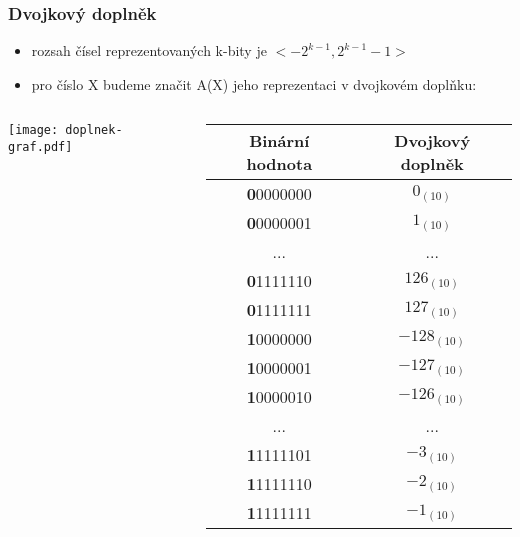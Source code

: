 \documentclass{beamer}
\begin{document}
\begin{frame}
\frametitle{Dvojkový doplněk}
\begin{itemize}
\item rozsah čísel reprezentovaných k-bity je $<-2^{k-1}, 2^{k-1}-1>$
\item pro číslo X budeme značit A(X) jeho reprezentaci v dvojkovém doplňku:
\end{itemize}
\vspace{-0.3cm}
\begin{columns}
\begin{column}{0.5\textwidth}
\texttt{[image: doplnek-graf.pdf]}
\end{column}
\hfill
\begin{column}{0.5\textwidth}
\begin{tabular}{|c|c|}\hline
{\small Binární hodnota}  & {\small Dvojkový doplněk} \\\hline
\textbf{0}0000000 & $0_{(10)}$ \\ \hline
\textbf{0}0000001 & $1_{(10)}$ \\ \hline
... & ... \\\hline
\textbf{0}1111110 & $126_{(10)}$ \\ \hline
\textbf{0}1111111 & $127_{(10)}$ \\ \hline
\textbf{1}0000000 & $-128_{(10)}$ \\ \hline
\textbf{1}0000001 & $-127_{(10)}$ \\ \hline
\textbf{1}0000010 & $-126_{(10)}$ \\ \hline
... & ... \\\hline
\textbf{1}1111101 & $-3_{(10)}$ \\ \hline
\textbf{1}1111110 & $-2_{(10)}$ \\ \hline
\textbf{1}1111111 & $-1_{(10)}$ \\ \hline
\end{tabular}
\end{column}
\end{columns}
\end{frame}
\end{document}
